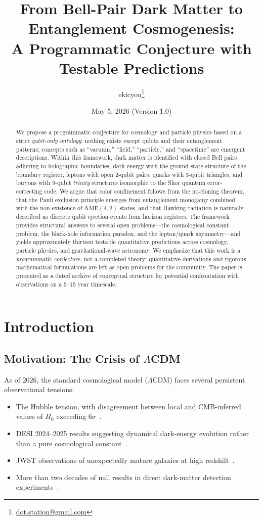 \documentclass[11pt,a4paper]{article}
\title{From Bell-Pair Dark Matter to Entanglement Cosmogenesis:\\
{\large A Programmatic Conjecture with Testable Predictions}}
\author[1]{ekicyou\thanks{\href{mailto:dot.station@gmail.com}{dot.station@gmail.com}}}
\affil[1]{Independent Researcher, Japan}
\date{May 5, 2026 (Version 1.0)}
\begin{document}
\maketitle

\begin{abstract}
\noindent
We propose a programmatic conjecture for cosmology and particle physics based on a strict \emph{qubit-only ontology}: nothing exists except qubits and their entanglement patterns; concepts such as ``vacuum,'' ``field,'' ``particle,'' and ``spacetime'' are emergent descriptions. Within this framework, dark matter is identified with closed Bell pairs adhering to holographic boundaries, dark energy with the ground-state structure of the boundary register, leptons with open 2-qubit pairs, quarks with 3-qubit triangles, and baryons with 9-qubit \emph{trinity} structures isomorphic to the Shor quantum error-correcting code. We argue that color confinement follows from the no-cloning theorem, that the Pauli exclusion principle emerges from entanglement monogamy combined with the non-existence of AME$(4,2)$ states, and that Hawking radiation is naturally described as discrete qubit ejection events from horizon registers. The framework provides structural answers to several open problems---the cosmological constant problem, the black-hole information paradox, and the lepton/quark asymmetry---and yields approximately thirteen testable quantitative predictions across cosmology, particle physics, and gravitational-wave astronomy. We emphasize that this work is a \emph{programmatic conjecture}, not a completed theory; quantitative derivations and rigorous mathematical formulations are left as open problems for the community. The paper is presented as a dated archive of conceptual structure for potential confrontation with observations on a 5--15 year timescale.
\end{abstract}

\section{Introduction}

\subsection{Motivation: The Crisis of $\Lambda$CDM}

As of 2026, the standard cosmological model ($\Lambda$CDM) faces several persistent observational tensions:
\begin{itemize}[leftmargin=*]
\item The Hubble tension, with disagreement between local and CMB-inferred values of $H_0$ exceeding $6\sigma$~\cite{Riess2022,Planck2020}.
\item DESI 2024--2025 results suggesting dynamical dark-energy evolution rather than a pure cosmological constant~\cite{DESI2024}.
\item JWST observations of unexpectedly mature galaxies at high redshift~\cite{Boylan2023}.
\item More than two decades of null results in direct dark-matter detection experiments~\cite{LUX2017,XENON2023}.
\end{itemize}
\end{document}
